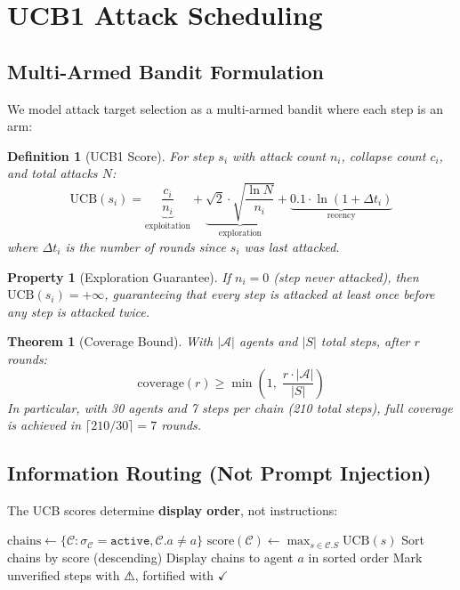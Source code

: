 \documentclass[11pt,a4paper]{article}
\newtheorem{definition}{Definition}
\newtheorem{theorem}{Theorem}
\newtheorem{property}{Property}
\begin{document}
\section{UCB1 Attack Scheduling}

\subsection{Multi-Armed Bandit Formulation}

We model attack target selection as a multi-armed bandit where each step is an arm:

\begin{definition}[UCB1 Score]
For step $s_i$ with attack count $n_i$, collapse count $c_i$, and total attacks $N$:
$$\text{UCB}(s_i) = \underbrace{\frac{c_i}{n_i}}_{\text{exploitation}} + \underbrace{\sqrt{2} \cdot \sqrt{\frac{\ln N}{n_i}}}_{\text{exploration}} + \underbrace{0.1 \cdot \ln(1 + \Delta t_i)}_{\text{recency}}$$
where $\Delta t_i$ is the number of rounds since $s_i$ was last attacked.
\end{definition}

\begin{property}[Exploration Guarantee]
If $n_i = 0$ (step never attacked), then $\text{UCB}(s_i) = +\infty$, guaranteeing that every step is attacked at least once before any step is attacked twice.
\end{property}

\begin{theorem}[Coverage Bound]
With $|\mathcal{A}|$ agents and $|S|$ total steps, after $r$ rounds:
$$\text{coverage}(r) \geq \min\left(1, \; \frac{r \cdot |\mathcal{A}|}{|S|}\right)$$
In particular, with 30 agents and 7 steps per chain (210 total steps), full coverage is achieved in $\lceil 210/30 \rceil = 7$ rounds.
\end{theorem}

\subsection{Information Routing (Not Prompt Injection)}

The UCB scores determine \textbf{display order}, not instructions:

\begin{algorithm}
\caption{Information Routing for Agent $a$}
\begin{algorithmic}[1]
\STATE $\text{chains} \leftarrow \{\mathcal{C} : \sigma_\mathcal{C} = \texttt{active}, \mathcal{C}.a \neq a\}$
    \STATE $\text{score}(\mathcal{C}) \leftarrow \max_{s \in \mathcal{C}.S} \text{UCB}(s)$
\ENDFOR
\STATE Sort chains by score (descending)
\STATE Display chains to agent $a$ in sorted order
\STATE Mark unverified steps with $\texttt{⚠}$, fortified with $\texttt{✓}$
\end{algorithmic}
\end{algorithm}
\end{document}
